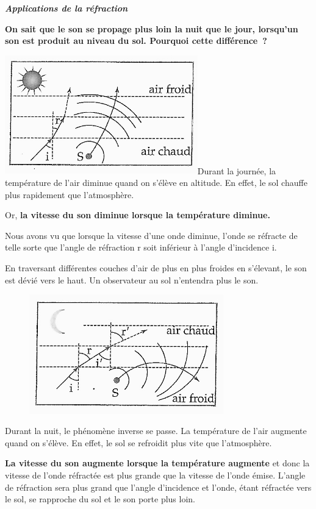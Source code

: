 \emph{\textbf{Applications de la réfraction}}

\textbf{On sait que le son se propage plus loin la nuit que le jour,
lorsqu'un son est produit au niveau du sol. Pourquoi cette différence~?
}

\includegraphics[width=8.356cm,height=5.151cm]{Pictures/100000010000021B0000014C687D75FBC118E240.png}Durant
la journée, la température de l'air diminue quand on s'élève en
altitude. En effet, le sol chauffe plus rapidement que l'atmosphère.

Or, \textbf{la vitesse du son diminue lorsque la température diminue.}

Nous avons vu que lorsque la vitesse d'une onde diminue, l'onde se
réfracte de telle sorte que l'angle de réfraction r soit inférieur à
l'angle d'incidence i.

En traversant différentes couches d'air de plus en plus froides en
s'élevant, le son est dévié vers le haut. Un observateur au sol
n'entendra plus le son.

\begin{figure}
\centering
\includegraphics[width=8.414cm,height=5.172cm]{Pictures/1000000100000226000001526F2E95C895BB2EC1.png}
\caption{}
\end{figure}

Durant la nuit, le phénomène inverse se passe. La température de l'air
augmente quand on s'élève. En effet, le sol se refroidit plus vite que
l'atmosphère.

\textbf{La vitesse du son augmente lorsque la température augmente} et
donc la vitesse de l'onde réfractée est plus grande que la vitesse de
l'onde émise. L'angle de réfraction sera plus grand que l'angle
d'incidence et l'onde, étant réfractée vers le sol, se rapproche du sol
et le son porte plus loin.

